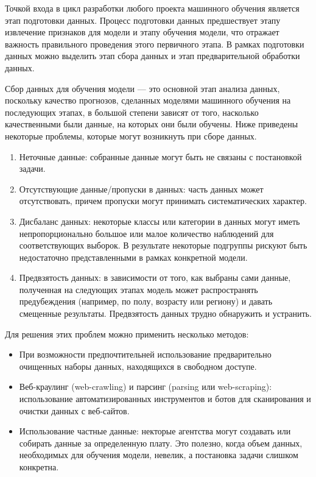 \documentclass[12pt,a4paper, oneside]{extreport}
\begin{document}
Точкой входа в цикл разработки любого проекта машинного обучения является этап подготовки данных.
Процесс подготовки  данных предшествует этапу извлечение признаков для модели и этапу обучения модели, что отражает важность правильного проведения этого первичного этапа.
В рамках подготовки данных можно выделить этап сбора данных и этап предварительной обработки данных.

Сбор данных для обучения модели — это основной этап анализа данных, поскольку качество прогнозов, сделанных  моделями машинного обучения на последующих этапах, в большой степени зависят от того, насколько качественными  были данные, на которых они были обучены. Ниже приведены некоторые проблемы, которые могут возникнуть при сборе данных.

\begin{enumerate}
	\item Неточные данные:  собранные данные могут быть не связаны с постановкой задачи.
	\item Отсутствующие данные/пропуски в данных: часть данных  может  отсутствовать, причем пропуски могут принимать систематических характер. 
	\item Дисбаланс данных: некоторые классы или категории в данных могут иметь непропорционально большое или малое количество наблюдений для соответствующих выборок. В результате некоторые подгруппы рискуют быть недостаточно представленными в рамках конкретной  модели.
	\item  Предвзятость данных: в зависимости от того, как выбраны сами данные, полученная на следующих этапах модель может  распространять предубеждения (например, по полу, возрасту или региону) и давать смещенные результаты. Предвзятость данных трудно обнаружить и устранить.	
\end{enumerate}

Для решения этих проблем можно применить несколько методов:

\begin{itemize}
	\item При возможности предпочтительней  использование предварительно очищенных наборы данных, находящихся в свободном доступе. 
	\item Веб-краулинг (web-crawling) и парсинг (parsing или  web-scraping):  использование автоматизированных инструментов и ботов для сканирования  и очистки данных с  веб-сайтов.
	\item Использование частные данные: некторые агентства могут создавать или собирать данные за определенную плату.  Это полезно, когда объем данных, необходимых для обучения модели, невелик, а постановка задачи слишком конкретна.
\end{itemize}
\end{document}
